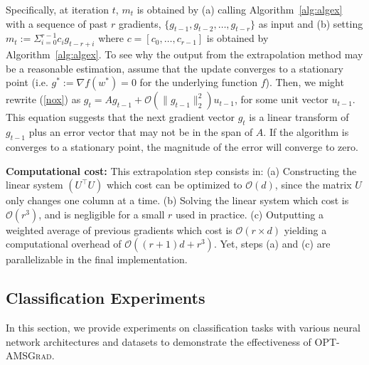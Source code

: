 \documentclass[11pt]{article}
\theoremstyle{k}
\begin{document}
Specifically, at iteration $t$, $m_t$ is obtained by \textsf{(a)} calling Algorithm~\ref{alg:algex} with a sequence of past $r$ gradients, $\{ g_{t-1},g_{t-2}, \dots, g_{t-r} \}$ as input and \textsf{(b)} setting $m_t:= \Sigma_{i=0}^{r-1} c_i g_{t-r+i}$ where $c = [c_0, \dots, c_{r-1}] $ is obtained by Algorithm~\ref{alg:algex}.
To see why the output from the extrapolation method may be a reasonable estimation, assume that the update converges to a stationary point (i.e. $g^*:=\nabla f(w^*) = 0$ for the underlying function $f$). Then, we might rewrite (\ref{nox}) as $g_t = A g_{t-1}  + \mathcal{O}( \| g_{t-1} \|_2^2 ) u_{t-1}$, for some unit vector $u_{t-1}$.
This equation suggests that the next gradient vector $g_{t}$ is a linear transform of $g_{{t-1}}$ plus an error vector that may not be in the span of $A$.
If the algorithm is converges to a stationary point, the magnitude of the error will converge to zero.

\textbf{Computational cost:}
 This extrapolation step consists in: \textsf{(a)} Constructing the linear system $(U^\top U)$ which cost can be optimized to $\mathcal{O}(d)$, since the matrix $U$ only changes one column at a time. \textsf{(b)} Solving the linear system which cost is $\mathcal{O}(r^3)$, and is negligible for a small $r$ used in practice.\textsf{ (c)} Outputting a weighted average of previous gradients which cost is $\mathcal{O}(r \times d)$ yielding a computational overhead of $\mathcal O\left((r+1)d+r^3\right)$.
Yet, steps (a) and (c) are parallelizable in the final implementation.
\vspace{-0.2in}
\subsection{Classification Experiments}
\vspace{-0.01in}
In this section, we provide experiments on classification tasks with various neural network architectures and datasets to demonstrate the effectiveness of \textsc{OPT-AMSGrad}.
\end{document}
